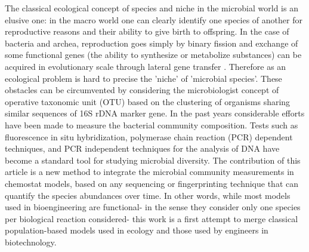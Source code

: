 \documentclass[3p,times]{article}
\begin{document}
The classical ecological concept of species and niche in the microbial world is an elusive one: in the macro world one can clearly identify one species of another for reproductive reasons and their ability to give birth to offspring. In the case of bacteria and archea, reproduction goes simply by binary fission and exchange of some functional genes (the ability to synthesize or metabolize substances) can be acquired in evolutionary scale through lateral gene transfer \cite{Boucher2003}. Therefore as an ecological problem is hard to precise the 'niche' of 'microbial species'. These obstacles can be circumvented by considering the microbiologist concept of operative taxonomic unit (OTU) based on the clustering of organisms sharing similar sequences of 16S rDNA marker gene. In the past years considerable efforts have been made to measure the bacterial community composition. Tests such as fluorescence in situ hybridization, polymerase chain reaction (PCR) dependent techniques, and PCR independent techniques for the analysis of DNA have become a standard tool for studying  microbial diversity\cite{FERRERA2016790}. The contribution of this article is a new method to integrate the microbial community measurements in chemostat models, based on any sequencing or fingerprinting technique that can quantify the species abundances over time. In other words, while most models used in bioengineering are functional- in the sense they consider only one species per biological reaction considered- this work is a first attempt to merge classical population-based models used in ecology and those used by engineers in biotechnology.
\end{document}
